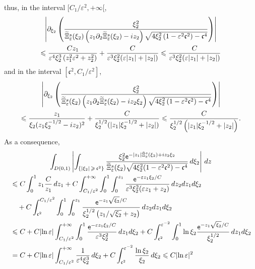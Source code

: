 \documentclass[10pt]{amsart}
\theoremstyle{definition}\newtheorem{defi}[theo]{Definition}\newtheorem{rema}[theo]{Remark}\newtheorem{exam}[theo]{Example}\newtheorem{exem}[theo]{Example}\newtheorem{nota}[theo]{Notation}
\newcommand*\p{\partial}
\newcommand*\ex{{\sf e}}
\newcommand*\cs{{\mathfrak c}}
\newcommand*\ii{\infty}
\newcommand*\gs{\geqslant }
\newcommand*\ls{\leqslant }
\newcommand*\e{\varepsilon}
\renewcommand*\t{\tilde}
\let\oldtilde\tilde
\renewcommand*{\tilde}[1]{\mathchoice{\widetilde{#1}}{\widetilde{#1}}{\oldtilde{#1}}{\oldtilde{#1}}}
\begin{document}
thus, in the interval $ [C_1 / \e^{2}, +\ii [$,
\begin{multline*}
 \left\lvert \p_{\xi_2} \left(\frac{ \xi_2^2 }{ \t\Xi_\e^s (\xi_2) \left(z_1 \p_2 \t\Xi_\e^s (\xi_2) - i z_2\right) \sqrt{ 4 \xi_2^2 \left(1 - \e^2 \cs^2\right) - \cs^4 } } \right)
\right\rvert
\\
\ls \frac{ C z_1 }{ \e^4 \xi_2^3 \left(z_1^2 \e^2 + z_2^2\right) } + \frac{ C }{ \e^3 \xi_2^2 (\e | z_1 | + |z_2 |) }
\ls \frac{ C }{ \e^3 \xi_2^2 (\e | z_1 | + |z_2 |) }
\end{multline*}
and in the interval $ [\cs^2, C_1 / \e^{2}] $,
\begin{multline*}
\left\lvert \p_{\xi_2} \left(\frac{ \xi_2^2 }{ \t\Xi_\e^s (\xi_2) \left(z_1 \p_2 \t\Xi_\e^s (\xi_2) - i z_2 \xi_2\right) \sqrt{ 4 \xi_2^2 \left(1 - \e^2 \cs^2\right) - \cs^4 } } \right)
\right\rvert
\\
\ls \frac{ z_1 }{ \xi_2 (z_1 \xi_2^{-1/2} - i z_2)^2 } + \frac{ C }{ \xi_2^{1/2} (| z_1 | \xi_2^{-1/2} + | z_2 |) }
\ls \frac{ C }{ \xi_2^{1/2} \left(| z_1 | \xi_2^{-1/2} + | z_2 |\right)}.
\end{multline*}
As a consequence,
\begin{multline*}
\int_{D(0,1)} \left\lvert \int_{\left\{ |\xi_2 |\,\gs\,\cs^{2} \right\} } \frac{ \xi_2^2 \ex^{- |z_1| \t\Xi_\e^s (\xi_2) + i z_2 \xi_2} }{
\t\Xi_\e^s (\xi_2) \sqrt{ 4 \xi_2^2 (1 - \e^2 \cs^2) - \cs^4 } } \, d\xi_2 \right\rvert \, dz
\\
\begin{aligned}
& \ls C \int_0^{1} z_1 \frac{C }{z_1} \, dz_1 + C \int_{ C_1 /\e^{2} }^{+\ii} \int_0^1 \int_0^{z_1} \frac{ \ex^{- \e z_1 \xi_2 / C} }{ \e^3 \xi_2^2 (\e z_1 + z_2) }\, dz_2 dz_1 d \xi_2
\\ &\quad + C \int_{\cs^2}^{ C_1 / \e^{2} } \int_0^1 \int_0^{z_1} \frac{ \ex^{- z_1 \sqrt{\xi_2} / C } }{ \xi_2^{1/2} \left(z_1 / \sqrt{\xi_2} + z_2\right) }\, dz_2 dz_1 d \xi_2
\\ &
\ls C + C \lvert \ln \e \rvert \int_{ C_1 /\e^{2} }^{+\ii} \int_0^1 \frac{ \ex^{- \e z_1 \xi_2 / C} }{ \e^3 \xi_2^2 }\, dz_1 d \xi_2 + C \int_{\cs^2}^{ \e^{-2} } \int_0^1 \ln \xi_2 \frac{ \ex^{- z_1 \sqrt{\xi_2} / C } }{ \xi_2^{1/2} } \, dz_1 d\xi_2
\\
& = C + C \lvert \ln \e \rvert \int_{ C_1 / \e^{2} }^{+\ii} \frac{ 1}{ \e^4 \xi_2^3 }\, d \xi_2 + C \int_{\cs^2}^{ \e^{-2} } \frac{ \ln \xi_2 }{ \xi_2 } \, d\xi_2
\ls C \lvert \ln \e \rvert^2
\end{aligned}
\end{multline*}
\end{document}
